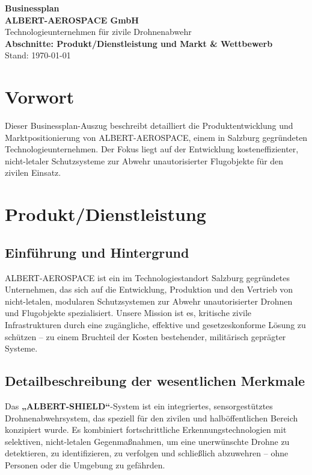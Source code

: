 \documentclass[11pt,a4paper]{article}
\begin{document}
\begin{center}
    \textbf{\Huge Businessplan} \\
    \vspace{0.5cm}
    \textbf{\LARGE ALBERT-AEROSPACE GmbH} \\
    \vspace{0.3cm}
    \large Technologieunternehmen für zivile Drohnenabwehr \\
    \vspace{1cm}
    \textbf{\Large Abschnitte: Produkt/Dienstleistung und Markt \& Wettbewerb} \\
    \vspace{0.5cm}
    \small Stand: \today
\end{center}

\vspace{1cm}

\section*{Vorwort}
Dieser Businessplan-Auszug beschreibt detailliert die Produktentwicklung und Marktpositionierung von ALBERT-AEROSPACE, einem in Salzburg gegründeten Technologieunternehmen. Der Fokus liegt auf der Entwicklung kosteneffizienter, nicht-letaler Schutzsysteme zur Abwehr unautorisierter Flugobjekte für den zivilen Einsatz.

\tableofcontents
\newpage

\section{Produkt/Dienstleistung}

\subsection{Einführung und Hintergrund}
ALBERT-AEROSPACE ist ein im Technologiestandort Salzburg gegründetes Unternehmen, das sich auf die Entwicklung, Produktion und den Vertrieb von nicht-letalen, modularen Schutzsystemen zur Abwehr unautorisierter Drohnen und Flugobjekte spezialisiert. Unsere Mission ist es, kritische zivile Infrastrukturen durch eine zugängliche, effektive und gesetzeskonforme Lösung zu schützen – zu einem Bruchteil der Kosten bestehender, militärisch geprägter Systeme.

\subsection{Detailbeschreibung der wesentlichen Merkmale}
Das \textbf{„ALBERT-SHIELD“}-System ist ein integriertes, sensorgestütztes Drohnenabwehrsystem, das speziell für den zivilen und halböffentlichen Bereich konzipiert wurde. Es kombiniert fortschrittliche Erkennungstechnologien mit selektiven, nicht-letalen Gegenmaßnahmen, um eine unerwünschte Drohne zu detektieren, zu identifizieren, zu verfolgen und schließlich abzuwehren – ohne Personen oder die Umgebung zu gefährden.
\end{document}
